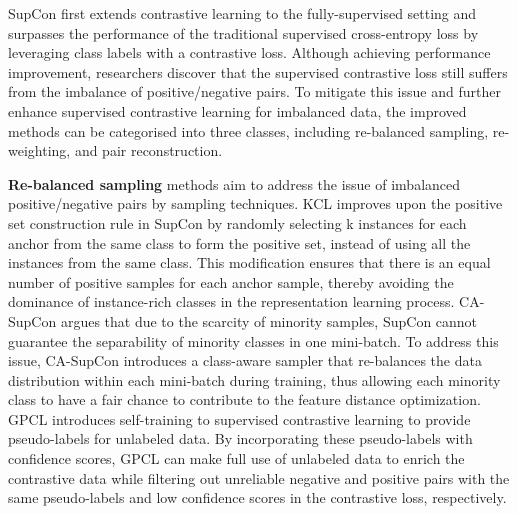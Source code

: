 SupCon \cite{khosla2020supervised} first extends contrastive learning to the fully-supervised setting and surpasses the performance of the traditional supervised cross-entropy loss by leveraging class labels with a contrastive loss. Although achieving performance improvement, researchers discover that the supervised contrastive loss still suffers from the imbalance of positive/negative pairs. To mitigate this issue and further enhance supervised contrastive learning for imbalanced data, the improved methods can be categorised into three classes, including {re-balanced sampling, re-weighting, and pair reconstruction}.


\textbf{Re-balanced sampling} methods aim to address the issue of imbalanced positive/negative pairs by sampling techniques. 
KCL \cite{kang2021exploring} improves upon the positive set construction rule in SupCon by randomly selecting k instances for each anchor from the same class to form the positive set, instead of using all the instances from the same class. This modification ensures that there is an equal number of positive samples for each anchor sample, thereby avoiding the dominance of instance-rich classes in the representation learning process.
CA-SupCon \cite{zhang2022class} argues that due to the scarcity of minority samples, SupCon cannot guarantee the separability of minority classes in one mini-batch. To address this issue, CA-SupCon introduces a class-aware sampler that re-balances the data distribution within each mini-batch during training, thus allowing each minority class to have a fair chance to contribute to the feature distance optimization.
GPCL \cite{jiang2021guided} introduces self-training to supervised contrastive learning to provide pseudo-labels for unlabeled data. By incorporating these pseudo-labels with confidence scores, GPCL can make full use of unlabeled data to enrich the contrastive data while filtering out unreliable negative and positive pairs with the same pseudo-labels and low confidence scores in the contrastive loss, respectively.


